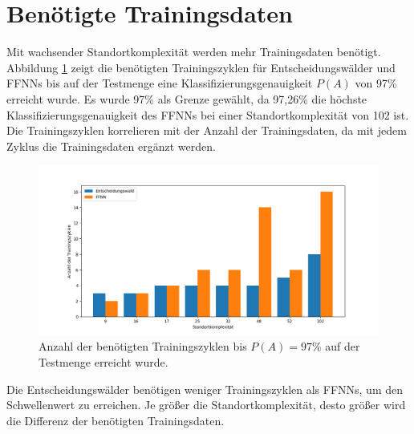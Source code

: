 \section{Benötigte Trainingsdaten}
Mit wachsender Standortkomplexität werden mehr Trainingsdaten benötigt.
Abbildung \ref{fig:required_training_data} zeigt die benötigten Trainingszyklen für Entscheidungswälder und FFNNs bis auf der Testmenge
eine Klassifizierungsgenauigkeit $P(A)$ von 97\% erreicht wurde.
Es wurde 97\% als Grenze gewählt, da 97,26\% die höchste Klassifizierungsgenauigkeit des FFNNs bei einer Standortkomplexität von 102 ist.
Die Trainingszyklen korrelieren mit der Anzahl der Trainingsdaten, da mit jedem Zyklus die Trainingsdaten ergänzt werden.
\begin{figure}[h!]
    \centering
    \includegraphics[width=\linewidth]{images/required_training_data.png}
    \caption{Anzahl der benötigten Trainingszyklen bis $P(A)=97\%$ auf der Testmenge erreicht wurde. }
    \label{fig:required_training_data}
\end{figure}
\newpage
Die Entscheidungswälder benötigen weniger Trainingszyklen als FFNNs, um den Schwellenwert zu erreichen.
Je größer die Standortkomplexität, desto größer wird die Differenz der benötigten Trainingsdaten.
